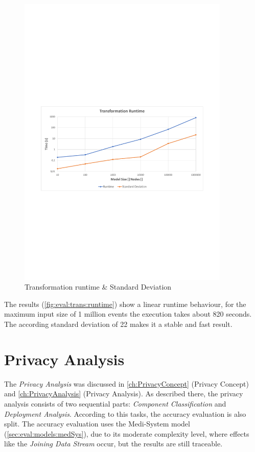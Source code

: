 \begin{figure}[h]
	\centering
	\includegraphics[trim = 10mm 90mm 10mm 110mm, clip, width=0.90\textwidth]{graphs/Runtime_Transformation}
	\caption{Transformation runtime \& Standard Deviation}
	\label{fig:eval:trans:runtime}
\end{figure}

The results (\autoref{fig:eval:trans:runtime}) show a linear runtime behaviour, for the maximum input size of 1 million events the execution takes about 820 seconds. The according standard deviation of 22 makes it a stable and fast result.

\section{Privacy Analysis}
\label{sec:Evaluation:privacyanalysis}

The \textit{Privacy Analysis} was discussed in \autoref{ch:PrivacyConcept} (Privacy Concept) and \autoref{ch:PrivacyAnalysis} (Privacy Analysis). As described there, the privacy analysis consists of two sequential parts: \textit{Component Classification} and \textit{Deployment Analysis}. According to this tasks, the accuracy evaluation is also split. The accuracy evaluation uses the Medi-System model (\autoref{sec:eval:models:medSys}), due to its moderate complexity level, where effects like the \textit{Joining Data Stream} occur, but the results are still traceable.

